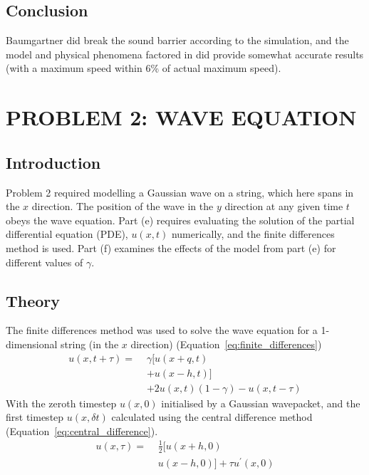 \documentclass[hyphens,twocolumn,nobalancelastpage,aps,10pt,citeautoscript,longbibliography]{revtex4-2}
\begin{document}
\subsection{Conclusion}%
\label{sub:conclusion_1}

\noindent Baumgartner did break the sound barrier according to the simulation,
and the model and physical phenomena factored in did provide somewhat accurate
results (with a maximum speed within 6\% of actual maximum speed).

\section{PROBLEM 2: WAVE EQUATION}%
\label{sec:problem_2_wave_equation}

\subsection{Introduction}%
\label{sub:introduction_2}

\noindent Problem 2 required modelling a Gaussian wave on a string, which here
spans in the $x$ direction. The position of the wave in the $y$ direction at
any given time $t$ obeys the wave equation. Part (e) requires evaluating the
solution of the partial differential equation (PDE), $u(x,t)$ numerically, and
the finite differences method is used. Part (f) examines the effects of the
model from part (e) for different values of $\gamma$.

\subsection{Theory}%
\label{sub:theory_2}

\noindent The finite differences method was used to solve the wave equation for
a 1-dimensional string (in the $x$ direction) (Equation~\ref{eq:finite_differences})
\begin{equation}
	\begin{aligned}
		u(x,t+\tau) =\,\, & \gamma[u(x+q,t)                 \\
		                  & + u(x-h,t)]                     \\
		                  & + 2u(x,t)(1-\gamma)-u(x,t-\tau)
	\end{aligned}
	\label{eq:finite_differences}%
\end{equation}
With the zeroth timestep $u(x,0)$ initialised by a Gaussian wavepacket, and the
first timestep $u(x,\delta t)$ calculated using the central difference method
(Equation~\ref{eq:central_difference}).
\begin{equation}
	\label{eq:central_difference}%
	\begin{aligned}
		u(x,\tau) =\,\, & \frac{1}{2}[u(x+h, 0)            \\
		                & u(x-h,0)] + \tau u^{\prime}(x,0)
	\end{aligned}
\end{equation}
\end{document}
